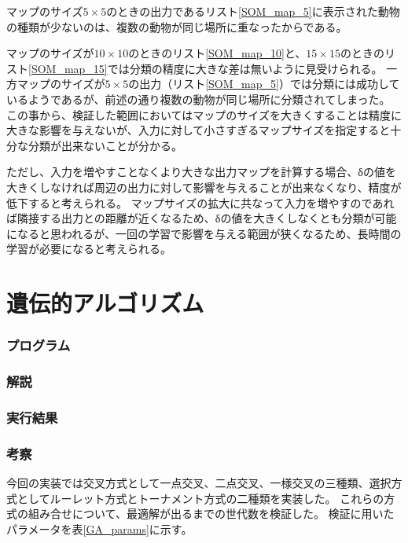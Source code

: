 \documentclass{jsarticle}
\begin{document}




マップのサイズ$5\times5$のときの出力であるリスト\ref{SOM_map_5}に表示された動物の種類が少ないのは、複数の動物が同じ場所に重なったからである。

マップのサイズが$10\times10$のときのリスト\ref{SOM_map_10}と、$15\times15$のときのリスト\ref{SOM_map_15}では分類の精度に大きな差は無いように見受けられる。
一方マップのサイズが$5\times5$の出力（リスト\ref{SOM_map_5}）では分類には成功しているようであるが、前述の通り複数の動物が同じ場所に分類されてしまった。
この事から、検証した範囲においてはマップのサイズを大きくすることは精度に大きな影響を与えないが、入力に対して小さすぎるマップサイズを指定すると十分な分類が出来ないことが分かる。

ただし、入力を増やすことなくより大きな出力マップを計算する場合、δの値を大きくしなければ周辺の出力に対して影響を与えることが出来なくなり、精度が低下すると考えられる。
マップサイズの拡大に共なって入力を増やすのであれば隣接する出力との距離が近くなるため、δの値を大きくしなくとも分類が可能になると思われるが、一回の学習で影響を与える範囲が狭くなるため、長時間の学習が必要になると考えられる。


\part{遺伝的アルゴリズム}
\section{プログラム}


\section{解説}


\section{実行結果}


\section{考察}
今回の実装では交叉方式として一点交叉、二点交叉、一様交叉の三種類、選択方式としてルーレット方式とトーナメント方式の二種類を実装した。
これらの方式の組み合せについて、最適解が出るまでの世代数を検証した。
検証に用いたパラメータを表\ref{GA_params}に示す。
\end{document}
